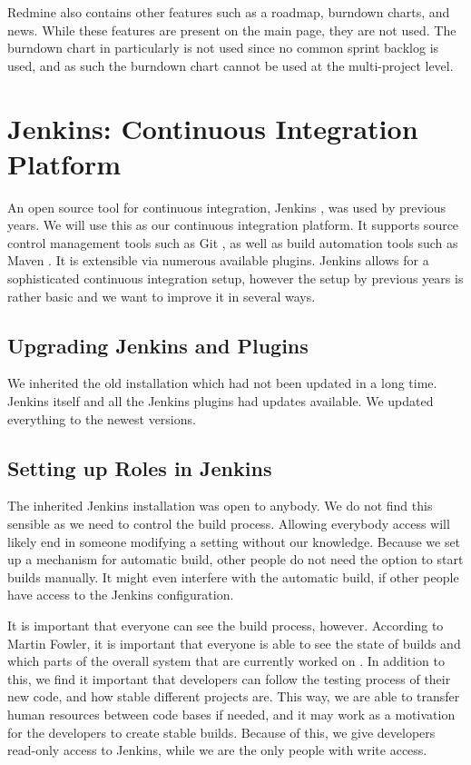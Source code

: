 Redmine also contains other features such as a roadmap, burndown charts, and news. While these features are present on the main page, they are not used. The burndown chart in particularly is not used since no common sprint backlog is used, and as such the burndown chart cannot be used at the multi-project level.

\section{Jenkins: Continuous Integration Platform}\label{sec:jenkins}
An open source tool for continuous integration, Jenkins \parencite{JenkinsWebsite}, was used by previous years. We will use this as our continuous integration platform. It supports source control management tools such as Git \parencite{gitwebsite}, as well as build automation tools such as Maven \parencite{mavenwebsite}. It is extensible via numerous available plugins. Jenkins allows for a sophisticated continuous integration setup, however the setup by previous years is rather basic and we want to improve it in several ways.

\subsection{Upgrading Jenkins and Plugins}
We inherited the old installation which had not been updated in a long time. Jenkins itself and all the Jenkins plugins had updates available. We updated everything to the newest versions.

\subsection{Setting up Roles in Jenkins}
The inherited Jenkins installation was open to anybody. We do not find this sensible as we need to control the build process. Allowing everybody access will likely end in someone modifying a setting without our knowledge. Because we set up a mechanism for automatic build, other people do not need the option to start builds manually. It might even interfere with the automatic build, if other people have access to the Jenkins configuration.

It is important that everyone can see the build process, however. According to Martin Fowler, it is important that everyone is able to see the state of builds and which parts of the overall system that are currently worked on \parencite{fowlerCI}. In addition to this, we find it important that developers can follow the testing process of their new code, and how stable different projects are. This way, we are able to transfer human resources between code bases if needed, and it may work as a motivation for the developers to create stable builds. Because of this, we give developers read-only access to Jenkins, while we are the only people with write access.

